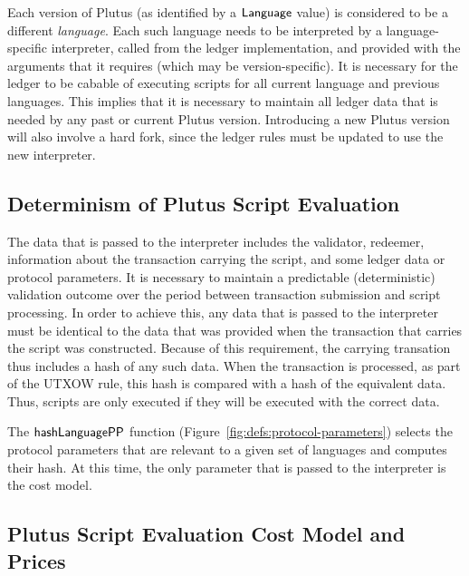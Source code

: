 Each version of Plutus (as identified by a $\mathsf{Language}$ value) is considered to be a different
\emph{language}.  Each such language needs to be interpreted by a language-specific interpreter, called from the ledger implementation,
and provided with the arguments that it requires (which may be version-specific).
It is necessary for the ledger to be cabable of executing scripts for all current language and previous languages.
This implies that it is necessary to maintain all ledger
data that is needed by any past or current Plutus version. Introducing a new Plutus version will also
involve a hard fork, since the ledger rules must be updated to use the new interpreter.

\subsection{Determinism of Plutus Script Evaluation}
\label{sec:determinism}

The data that is passed to the interpreter
includes the validator, redeemer, information about the transaction carrying
the script, and some ledger data or protocol parameters.
It is necessary to maintain a predictable (deterministic) validation outcome over the period between transaction
submission and script processing.
%
In order to achieve this,
any data that is passed to the interpreter must be
identical to the data that was provided when the transaction that carries the script was
constructed.
Because of this requirement, the carrying transation thus includes a hash of any such data.
When the transaction is processed, as part of the UTXOW rule, this hash is compared with a hash of the equivalent data. Thus, scripts are only executed if they will be executed with the correct data.

The $\mathsf{hashLanguagePP}$ function (Figure~\ref{fig:defs:protocol-parameters}) selects the protocol parameters that are relevant to
a given set of languages and computes their hash.
%
At this time, the only parameter that is passed to the interpreter is the cost model.

\subsection{Plutus Script Evaluation Cost Model and Prices}
\label{sec:cost-mod}

